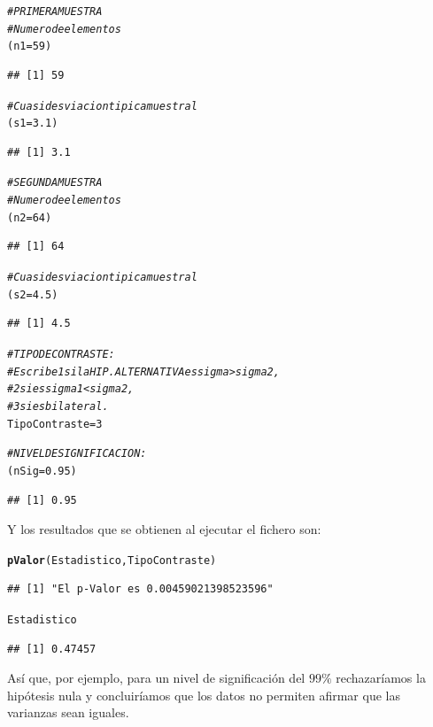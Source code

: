 \documentclass[10pt,a4paper]{article}\usepackage[]{graphicx}\usepackage[]{color}
\makeatletter
\newcommand{\hlnum}[1]{\textcolor[rgb]{0.686,0.059,0.569}{#1}}%
\newcommand{\hlcom}[1]{\textcolor[rgb]{0.678,0.584,0.686}{\textit{#1}}}%
\newcommand{\hlstd}[1]{\textcolor[rgb]{0.345,0.345,0.345}{#1}}%
\newcommand{\hlkwb}[1]{\textcolor[rgb]{0.69,0.353,0.396}{#1}}%
\newcommand{\hlkwd}[1]{\textcolor[rgb]{0.737,0.353,0.396}{\textbf{#1}}}%
\newenvironment{kframe}{%
 \def\at@end@of@kframe{}%
 \ifinner\ifhmode%
  \def\at@end@of@kframe{\end{minipage}}%
  \begin{minipage}{\columnwidth}%
 \fi\fi%
 \def\FrameCommand##1{\hskip\@totalleftmargin \hskip-\fboxsep
 \colorbox{shadecolor}{##1}\hskip-\fboxsep
     \hskip-\linewidth \hskip-\@totalleftmargin \hskip\columnwidth}%
 \MakeFramed {\advance\hsize-\width
   \@totalleftmargin\z@ \linewidth\hsize
   \@setminipage}}%
 {\par\unskip\endMakeFramed%
 \at@end@of@kframe}
\newenvironment{knitrout}{}{} %
\makeatother
\begin{document}
\begin{knitrout}
\color{fgcolor}\begin{kframe}
\begin{alltt}
 \hlcom{# PRIMERA MUESTRA}
 \hlcom{# Numero de elementos}
 \hlstd{(n1} \hlkwb{=} \hlnum{59}\hlstd{)}
\end{alltt}
\begin{verbatim}
## [1] 59
\end{verbatim}
\begin{alltt}
 \hlcom{# Cuasidesviacion tipica muestral}
 \hlstd{(s1} \hlkwb{=} \hlnum{3.1}\hlstd{)}
\end{alltt}
\begin{verbatim}
## [1] 3.1
\end{verbatim}
\begin{alltt}
 \hlcom{# SEGUNDA MUESTRA}
 \hlcom{# Numero de elementos}
 \hlstd{(n2} \hlkwb{=}  \hlnum{64}\hlstd{)}
\end{alltt}
\begin{verbatim}
## [1] 64
\end{verbatim}
\begin{alltt}
 \hlcom{# Cuasidesviacion tipica  muestral}
 \hlstd{(s2} \hlkwb{=} \hlnum{4.5}\hlstd{)}
\end{alltt}
\begin{verbatim}
## [1] 4.5
\end{verbatim}
\begin{alltt}
 \hlcom{# TIPO DE CONTRASTE:}
 \hlcom{# Escribe 1 si la HIP. ALTERNATIVA es sigma > sigma2,}
 \hlcom{#         2 si es sigma1 < sigma2,}
 \hlcom{#         3 si es bilateral.}
 \hlstd{TipoContraste} \hlkwb{=} \hlnum{3}

 \hlcom{#NIVEL DE SIGNIFICACION:}
 \hlstd{(nSig} \hlkwb{=} \hlnum{0.95}\hlstd{)}
\end{alltt}
\begin{verbatim}
## [1] 0.95
\end{verbatim}
\end{kframe}
\end{knitrout}



Y los resultados que se obtienen al ejecutar el fichero son:
\begin{knitrout}
\color{fgcolor}\begin{kframe}
\begin{alltt}
     \hlkwd{pValor}\hlstd{(Estadistico,TipoContraste)}
\end{alltt}
\begin{verbatim}
## [1] "El p-Valor es 0.00459021398523596"
\end{verbatim}
\begin{alltt}
     \hlstd{Estadistico}
\end{alltt}
\begin{verbatim}
## [1] 0.47457
\end{verbatim}
\end{kframe}
\end{knitrout}
Así que, por ejemplo, para un nivel de significación del $99\%$ rechazaríamos la hipótesis nula y concluiríamos que los datos no permiten afirmar que las varianzas sean iguales.
\end{document}
